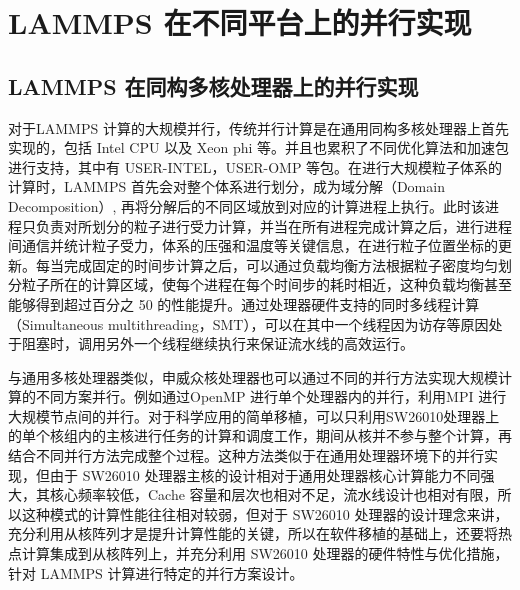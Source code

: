 \section{LAMMPS 在不同平台上的并行实现}
\subsection{LAMMPS 在同构多核处理器上的并行实现}
对于LAMMPS 计算的大规模并行，传统并行计算是在通用同构多核处理器上首先实现的，包括 Intel CPU 以及 Xeon phi 等。并且也累积了不同优化算法和加速包进行支持，其中有 USER-INTEL，USER-OMP 等包。在进行大规模粒子体系的计算时，LAMMPS 首先会对整个体系进行划分，成为域分解（Domain Decomposition）, 再将分解后的不同区域放到对应的计算进程上执行。此时该进程只负责对所划分的粒子进行受力计算，并当在所有进程完成计算之后，进行进程间通信并统计粒子受力，体系的压强和温度等关键信息，在进行粒子位置坐标的更新。每当完成固定的时间步计算之后，可以通过负载均衡方法根据粒子密度均匀划分粒子所在的计算区域，使每个进程在每个时间步的耗时相近，这种负载均衡甚至能够得到超过百分之 50 的性能提升。通过处理器硬件支持的同时多线程计算（Simultaneous multithreading，SMT），可以在其中一个线程因为访存等原因处于阻塞时，调用另外一个线程继续执行来保证流水线的高效运行。

与通用多核处理器类似，申威众核处理器也可以通过不同的并行方法实现大规模计算的不同方案并行。例如通过OpenMP 进行单个处理器内的并行，利用MPI 进行大规模节点间的并行。对于科学应用的简单移植，可以只利用SW26010处理器上的单个核组内的主核进行任务的计算和调度工作，期间从核并不参与整个计算，再结合不同并行方法完成整个过程。这种方法类似于在通用处理器环境下的并行实现，但由于 SW26010 处理器主核的设计相对于通用处理器核心计算能力不同强大，其核心频率较低，Cache 容量和层次也相对不足，流水线设计也相对有限，所以这种模式的计算性能往往相对较弱，但对于 SW26010 处理器的设计理念来讲，充分利用从核阵列才是提升计算性能的关键，所以在软件移植的基础上，还要将热点计算集成到从核阵列上，并充分利用 SW26010 处理器的硬件特性与优化措施，针对 LAMMPS 计算进行特定的并行方案设计。

